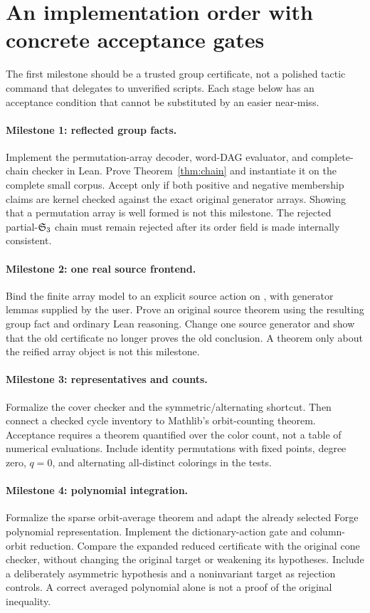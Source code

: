 \section{An implementation order with concrete acceptance gates}
\label{sec:roadmap}
The first milestone should be a trusted group certificate, not a polished tactic command that delegates to unverified scripts. Each stage below has an acceptance condition that cannot be substituted by an easier near-miss.

\paragraph{Milestone 1: reflected group facts.}
Implement the permutation-array decoder, word-DAG evaluator, and complete-chain checker in Lean. Prove Theorem~\ref{thm:chain} and instantiate it on the complete small corpus. Accept only if both positive and negative membership claims are kernel checked against the exact original generator arrays. Showing that a permutation array is well formed is not this milestone. The rejected partial-$\mathfrak S_3$ chain must remain rejected after its order field is made internally consistent.

\paragraph{Milestone 2: one real source frontend.}
Bind the finite array model to an explicit source action on , with generator lemmas supplied by the user. Prove an original source theorem using the resulting group fact and ordinary Lean reasoning. Change one source generator and show that the old certificate no longer proves the old conclusion. A theorem only about the reified array object is not this milestone.

\paragraph{Milestone 3: representatives and counts.}
Formalize the cover checker and the symmetric/alternating shortcut. Then connect a checked cycle inventory to Mathlib's orbit-counting theorem. Acceptance requires a theorem quantified over the color count, not a table of numerical evaluations. Include identity permutations with fixed points, degree zero, $q=0$, and alternating all-distinct colorings in the tests.

\paragraph{Milestone 4: polynomial integration.}
Formalize the sparse orbit-average theorem and adapt the already selected Forge polynomial representation. Implement the dictionary-action gate and column-orbit reduction. Compare the expanded reduced certificate with the original cone checker, without changing the original target or weakening its hypotheses. Include a deliberately asymmetric hypothesis and a noninvariant target as rejection controls. A correct averaged polynomial alone is not a proof of the original inequality.

